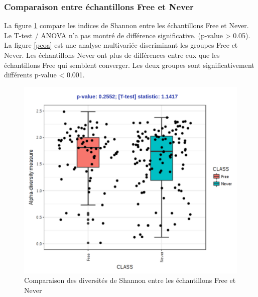\documentclass[12pt,a4paper]{article}
\begin{document}
\subsubsection{Comparaison entre échantillons Free et Never}
La figure \ref{compare} compare les indices de Shannon entre les échantillons Free et Never. Le T-test / ANOVA n'a pas montré de différence significative. (p-value > 0.05). \\
La figure  \ref{pcoa} est une analyse multivariée discriminant les groupes Free et Never. Les échantillons Never ont plus de différences entre eux que les échantillons Free qui semblent converger.  Les deux groupes sont significativement différents p-value < 0.001.

\begin{figure}
\begin{center}
\includegraphics[scale=0.70]{img/compare.png}\hfill
\end{center}
\caption{Comparaison des diversités de Shannon entre les échantillons Free et Never}
\label{compare}
\end{figure}
\end{document}
